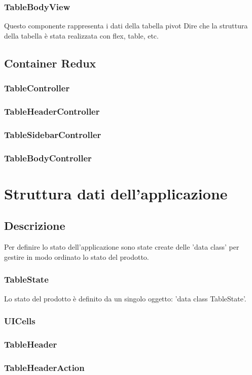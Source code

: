 \subsubsection{TableBodyView}
Questo componente rappresenta i dati della tabella pivot
Dire che la struttura della tabella è stata realizzata con flex, table, etc.

\subsection{Container Redux}
\subsubsection{TableController}
\subsubsection{TableHeaderController}
\subsubsection{TableSidebarController}
\subsubsection{TableBodyController}

\section{Struttura dati dell'applicazione}

\subsection{Descrizione}
Per definire lo stato dell'applicazione sono state create delle 'data class' per gestire in modo ordinato lo stato del prodotto.
\subsubsection{TableState}
Lo stato del prodotto è definito da un singolo oggetto: 'data class TableState'.
\subsubsection{UICells}
\subsubsection{TableHeader}
\subsubsection{TableHeaderAction}
